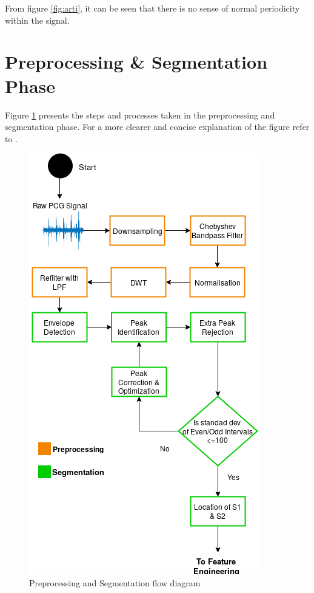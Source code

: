 \documentclass[10pt,twocolumn]{witseiepaper}
\begin{document}
From figure \ref{fig:arti}, it can be seen that there is no sense of normal periodicity within the signal.

\section{Preprocessing \& Segmentation Phase}
\label{app:preseg}
Figure \ref{fig:preseg} presents the steps and processes taken in the preprocessing and segmentation phase. For a more clearer and concise explanation of the figure refer to \cite{love}.

\begin{figure}[h!]
    \centering
    \includegraphics[scale=0.5]{./PreSeg.png}
    \caption{Preprocessing and Segmentation flow diagram}
    \label{fig:preseg}
\end{figure}{}
\end{document}
